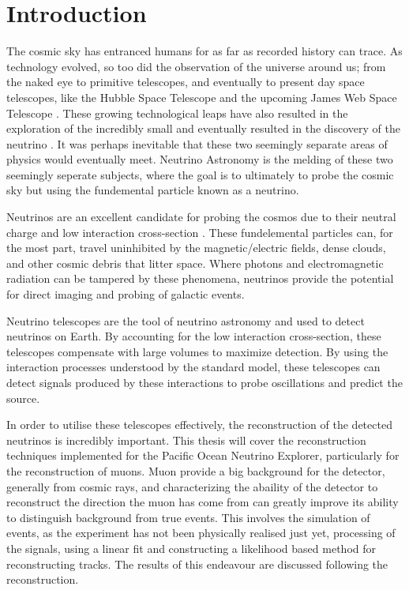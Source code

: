 \chapter{Introduction}

The cosmic sky has entranced humans for as far as recorded history can trace. As technology evolved, so too did the observation of the universe around us; from the naked eye to primitive telescopes, and eventually to present day space telescopes, like the Hubble Space Telescope and the upcoming James Web Space Telescope \cite{jwst}. These growing technological leaps have also resulted in the exploration of the incredibly small and eventually resulted in the discovery of the neutrino \cite{aneut}. It was perhaps inevitable that these two seemingly separate areas of physics would eventually meet. Neutrino Astronomy is the melding of these two seemingly seperate subjects, where the goal is to ultimately to probe the cosmic sky but using the fundemental particle known as a neutrino.

Neutrinos are an excellent candidate for probing the cosmos due to their neutral charge and low interaction cross-section \cite{pdg}. These fundelemental particles can, for the most part, travel uninhibited by the magnetic/electric fields, dense clouds, and other cosmic debris that litter space. Where photons and electromagnetic radiation can be tampered by these phenomena, neutrinos provide the potential for direct imaging and probing of galactic events. 

Neutrino telescopes are the tool of neutrino astronomy and used to detect neutrinos on Earth. By accounting for the low interaction cross-section, these telescopes compensate with large volumes to maximize detection. By using the interaction processes understood by the standard model, these telescopes can detect signals produced by these interactions to probe oscillations and predict the source. 

In order to utilise these telescopes effectively, the reconstruction of the detected neutrinos is incredibly important. This thesis will cover the reconstruction techniques implemented for the Pacific Ocean Neutrino Explorer, particularly for the reconstruction of muons. Muon provide a big background for the detector, generally from cosmic rays, and characterizing the abaility of the detector to reconstruct the direction the muon has come from can greatly improve its ability to distinguish background from true events. This involves the simulation of events, as the experiment has not been physically realised just yet, processing of the signals, using a linear fit and constructing a likelihood based method for reconstructing tracks. The results of this endeavour are discussed following the reconstruction.







